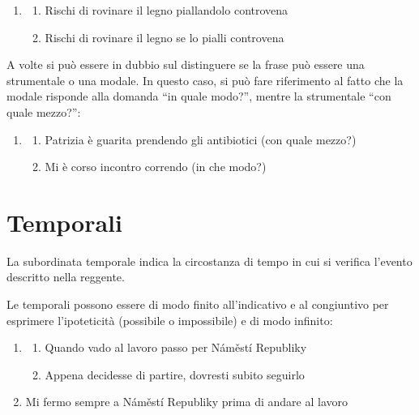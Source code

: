 \documentclass[
  a4paper,
  twoside,
  11pt,
  chapterprefix=false,
  bibliography=totocnumbered,
  listof=flat]{scrbook}
\providecommand{\tightlist}{%
  \setlength{\itemsep}{0pt}\setlength{\parskip}{0pt}}
\begin{document}
\begin{enumerate}
\def\labelenumi{(\arabic{enumi})}
\setcounter{enumi}{107}
\item
  \begin{enumerate}
  \def\labelenumii{\alph{enumii}.}
  \tightlist
  \item
    Rischi di rovinare il legno piallandolo controvena
  \item
    Rischi di rovinare il legno se lo pialli controvena
  \end{enumerate}
\end{enumerate}

A volte si può essere in dubbio sul distinguere se la frase può essere una strumentale o una modale. In questo caso, si può fare riferimento al fatto che la modale risponde alla domanda \enquote{in quale modo?}, mentre la strumentale \enquote{con quale mezzo?}:

\begin{enumerate}
\def\labelenumi{(\arabic{enumi})}
\setcounter{enumi}{108}
\item
  \begin{enumerate}
  \def\labelenumii{\alph{enumii}.}
  \tightlist
  \item
    Patrizia è guarita prendendo gli antibiotici (con quale mezzo?)
  \item
    Mi è corso incontro correndo (in che modo?)
  \end{enumerate}
\end{enumerate}

\hypertarget{temporali}{%
\section{Temporali}\label{temporali}}

La subordinata temporale indica la circostanza di tempo in cui si verifica l'evento descritto nella reggente.

Le temporali possono essere di modo finito all'indicativo e al congiuntivo per esprimere l'ipoteticità (possibile o impossibile) e di modo infinito:

\begin{enumerate}
\def\labelenumi{(\arabic{enumi})}
\setcounter{enumi}{109}
\item
  \begin{enumerate}
  \def\labelenumii{\alph{enumii}.}
  \tightlist
  \item
    Quando vado al lavoro passo per Náměstí Republiky
  \item
    Appena decidesse di partire, dovresti subito seguirlo
  \end{enumerate}
\item
  Mi fermo sempre a Náměstí Republiky prima di andare al lavoro
\end{enumerate}
\end{document}
